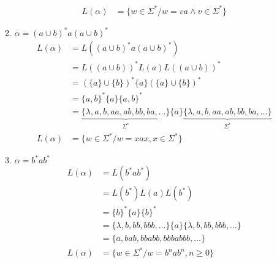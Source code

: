 \begin{itemize}
\begin{enumerate}[label=\alph*)]
\begin{align*}
		L(\alpha ) & = \{ w\in\Sigma^* / w=va \wedge v\in\Sigma^* \}
	\end{align*}
\item $\alpha = (a \cup b)^* a (a \cup b)^*$
	\begin{align*}
		L(\alpha ) & = L( (a\cup b )^* a (a\cup b )^* )\\
			     & = L( (a\cup b) )^* L(a) L((a\cup b))^* \\
			     & = (\{a\} \cup \{ b\})^* \{a\} (\{a\} \cup \{ b\})^*\\
			     & = \{a,b\}^* \{a\} \{a,b\}^* \\
			     & = \underbrace{\{ \lambda,a,b,aa,ab,bb,ba,\ldots \}}_{\Sigma^*} \{a\}  \underbrace{\{ \lambda,a,b,aa,ab,bb,ba,\ldots \}}_{\Sigma^*}\\
		L(\alpha ) & = \{ w\in\Sigma^* / w=xax, x\in\Sigma^* \}
	\end{align*}
\item $\alpha = b^* a b^*$
	\begin{align*}
		L(\alpha ) & = L(b^* a b^*)\\
			     & = L(b^*)L(a) L(b^*)\\
			     & = \{b\}^* \{ a \} \{ b\}^* \\
			     & = \{\lambda,b,bb,bbb,\ldots \} \{ a\} \{\lambda,b,bb,bbb,\ldots \} \\
			     & = \{a,bab,bbabb,bbbabbb,\ldots \} \\
		L(\alpha ) & = \{ w\in\Sigma^* / w = b^n a b^n ,n \geq 0 \}
	\end{align*}
\end{enumerate}
\end{itemize}

